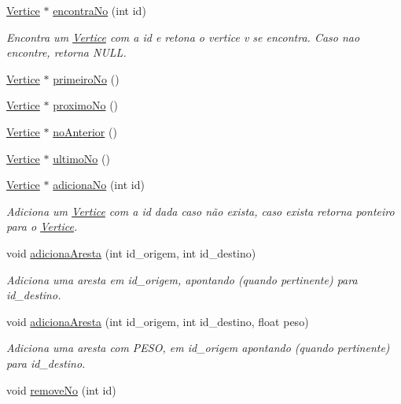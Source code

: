 \begin{DoxyCompactItemize}
\hyperlink{class_vertice}{Vertice} $\ast$ \hyperlink{class_grafo_a2e8822f36da76855c6c2471731570d16}{encontra\-No} (int id)
\begin{DoxyCompactList}\small\item\em Encontra um \hyperlink{class_vertice}{Vertice} com a id e retona o vertice v se encontra. Caso nao encontre, retorna N\-U\-L\-L. \end{DoxyCompactList}\item 
\hyperlink{class_vertice}{Vertice} $\ast$ \hyperlink{class_grafo_aa6442a6688c71ad58946108cf5328213}{primeiro\-No} ()
\item 
\hyperlink{class_vertice}{Vertice} $\ast$ \hyperlink{class_grafo_ab6840a0ed069a45b57cb4140c8063d56}{proximo\-No} ()
\item 
\hyperlink{class_vertice}{Vertice} $\ast$ \hyperlink{class_grafo_a69279737c6e6f788feb2f45ffe944561}{no\-Anterior} ()
\item 
\hyperlink{class_vertice}{Vertice} $\ast$ \hyperlink{class_grafo_a4a003c3d61527160cd1e156b6f86f92e}{ultimo\-No} ()
\item 
\hyperlink{class_vertice}{Vertice} $\ast$ \hyperlink{class_grafo_a907b0bcb9e8efb64098bd799d8876399}{adiciona\-No} (int id)
\begin{DoxyCompactList}\small\item\em Adiciona um \hyperlink{class_vertice}{Vertice} com a id dada caso não exista, caso exista retorna ponteiro para o \hyperlink{class_vertice}{Vertice}. \end{DoxyCompactList}\item 
void \hyperlink{class_grafo_a9f8e73f1d74ad07d931b678adfb7066e}{adiciona\-Aresta} (int id\-\_\-origem, int id\-\_\-destino)
\begin{DoxyCompactList}\small\item\em Adiciona uma aresta em id\-\_\-origem, apontando (quando pertinente) para id\-\_\-destino. \end{DoxyCompactList}\item 
void \hyperlink{class_grafo_a6c406dd5c7eaaed2dbd1d80528b14972}{adiciona\-Aresta} (int id\-\_\-origem, int id\-\_\-destino, float peso)
\begin{DoxyCompactList}\small\item\em Adiciona uma aresta com P\-E\-S\-O, em id\-\_\-origem apontando (quando pertinente) para id\-\_\-destino. \end{DoxyCompactList}\item 
void \hyperlink{class_grafo_a1218362fe45c08e2a8d8729d5c45cbf7}{remove\-No} (int id)

\end{DoxyCompactItemize}
